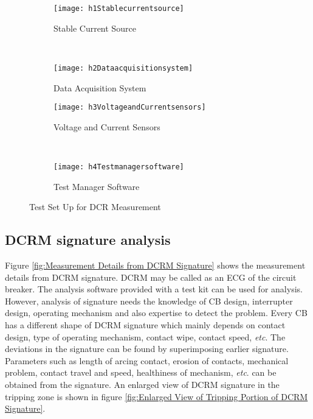 \begin{figure}
    \centering
    \begin{subfigure}[b]{0.49\textwidth}
        \centering
        \texttt{[image: h1Stablecurrentsource]}
        \caption{Stable Current Source}
        \label{fig:Stable current source}
    \end{subfigure}
    \\
    \begin{subfigure}[b]{0.49\textwidth}
        \centering
        \texttt{[image: h2Dataacquisitionsystem]}
        \caption{Data Acquisition System}
        \label{fig:Data acquisition system}
    \end{subfigure}
    \begin{subfigure}[b]{0.49\textwidth}
        \centering
        \texttt{[image: h3VoltageandCurrentsensors]}
        \caption{Voltage and Current Sensors}
        \label{fig:Voltage and Current sensors}
    \end{subfigure}
    \\
    \begin{subfigure}[b]{0.49\textwidth}
        \centering
        \texttt{[image: h4Testmanagersoftware]}
        \caption{Test Manager Software}
        \label{fig:Test manager software}
    \end{subfigure}
    \caption{Test Set Up for DCR Measurement}
    \label{fig:Test set up for DCR Measurement}
\end{figure}

\subsection{DCRM signature analysis}
Figure \ref{fig:Measurement Details from DCRM Signature} shows the measurement details from DCRM signature. DCRM may be called as an ECG of the circuit breaker. The analysis software provided with a test kit can be used for analysis. However, analysis of signature needs the knowledge of CB design, interrupter design, operating mechanism and also expertise to detect the problem. Every CB has a different shape of DCRM signature which mainly depends on contact design, type of operating mechanism, contact wipe, contact speed, \textit{etc}. The deviations in the signature can be found by superimposing earlier signature. Parameters such as length of arcing contact, erosion of contacts, mechanical problem, contact travel and speed, healthiness of mechanism, \textit{etc}. can be obtained from the signature. An enlarged view of DCRM signature in the tripping zone is shown in figure \ref{fig:Enlarged View of Tripping Portion of DCRM Signature}.

